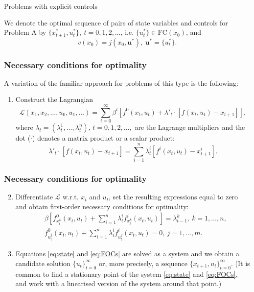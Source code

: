 \documentclass[10pt]{beamer}
\theoremstyle{definition}
\begin{document}
\begin{section}{Problems with explicit controls}
\begin{frame}[fragile]
We denote the optimal sequence of pairs of state variables and controls for Problem A by $\{x^*_{t+1},u^*_t\},~t=0,1,2,\ldots$, i.e. $\{u^*_t\} \in \textrm{FC}(x_0)$, and $$v(x_0)=j(x_0,\mathbf{u^*}),~\mathbf{u^*}=\{u^*_t\}.$$
\end{frame}



\begin{frame}[fragile]
\frametitle{Necessary conditions for optimality}
A variation of the familiar approach for problems of this type is the following:\begin{enumerate}
\item Construct the Lagrangian
\[\mathcal{L}(x_1,x_2,\ldots,u_0,u_1,\ldots) =
 \sum_{t=0}^{\infty}\beta^t \left[ f^0(x_t,u_t) + \lambda'_t \cdot
[f(x_t,u_t)-x_{t+1}] \right],  \] where $\lambda_t=(\lambda^1_t,\ldots,\lambda^n_t)$, $t=0,1,2,\ldots,$ are the Lagrange multipliers and the dot ($ \cdot $) denotes a matrix product or a scalar product: $$\lambda'_t \cdot [f(x_t,u_t)-x_{t+1}]
= \sum_{i=1}^n \lambda_t^i [f^i(x_t,u_t)-x^i_{t+1}].$$
\end{enumerate}
\end{frame}



\begin{frame}[fragile]
\frametitle{Necessary conditions for optimality}
\begin{enumerate} \setcounter{enumi}{1}
\item Differentiate $\mathcal{L}$ w.r.t. $x_t$ and $u_t$, set the resulting expressions equal to zero and obtain first-order necessary conditions for optimality: \begin{equation}\begin{split}
& \beta \left[ f^0_{x_t^k}(x_t,u_t)+\sum_{i=1}^n \lambda_t^i f^i_{x_t^k}(x_t,u_t)\right] = \lambda^k_{t-1},~ k=1,\ldots,n, \\
& f^0_{u_t^j}(x_t,u_t)+ \sum_{i=1}^n \lambda_t^i f^i_{u_t^j}(x_t,u_t) = 0,~ j=1,\ldots,m.
\end{split}
\label{eq:FOCs}
\end{equation}
\item Equations \eqref{eq:state} and \eqref{eq:FOCs} are solved as a system and we obtain a candidate solution $\{u_t\}_{t=0}^\infty$ or, more precisely, a sequence
$\{x_{t+1},u_t\}_{t=0}^\infty$. (It is common to find a stationary point of the system \eqref{eq:state} and \eqref{eq:FOCs}, and work with a linearised version of the system around that point.)
\end{enumerate}
\end{frame}



\end{section}
\end{document}
